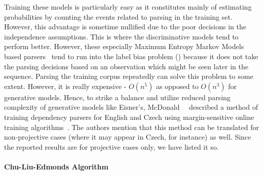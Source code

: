 Training these models is particularly easy as it constitutes mainly of estimating probabilities by counting the events related to parsing in the training set. However, this advantage is sometime nullified due to the poor decisions in the independence assumptions. This is where the discriminative models tend to perform better. However, these especially Maximum Entropy Markov Models based parsers~\cite{ratnaparkhi1999learning} tend to run into the label bias problem () because it does not take the parsing decisions based on an observation which might be seen later in the sequence. Parsing the training corpus repeatedly can solve this problem to some extent. However, it is really expensive - $O(n^5)$ as opposed to $O(n^3)$ for generative models. Hence, to strike a balance and utilize reduced parsing complexity of generative models like Eisner's, McDonald~\etal~\cite{McDonald:2005:OLT:1219840.1219852} described a method of training dependency parsers for English and Czech using margin-sensitive online training algorithms~\cite{crammer2003ultraconservative,shalev2003online}. The authors mention that this method can be translated for non-projective cases (where it may appear in Czech, for instance) as well. Since the reported results are for projective cases only, we have listed it so.



\paragraph*{Chu-Liu-Edmonds Algorithm}

